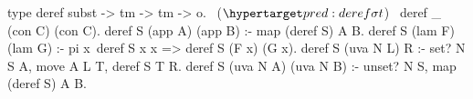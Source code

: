 \begin{elpicode}
  type deref subst -> tm -> tm -> o.                   ~($\customlabel{pred:deref}{\sigma t}$)~
  deref _ (con C) (con C).
  deref S (app A) (app B) :- map (deref S) A B.
  deref S (lam F) (lam G) :-
    pi x\ deref S x x => deref S (F x) (G x).
  deref S (uva N L) R :- set? N S A,
    move A L T, deref S T R.
  deref S (uva N A) (uva N B) :- unset? N S,
    map (deref S) A B.
\end{elpicode}
